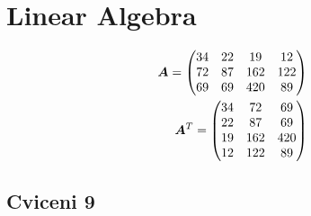\documentclass[12pt]{article}
\begin{document}
    \section{Linear Algebra}\label{sec:linalg}

    \begin{align}
        {\bm{A}} = \left(\begin{matrix}
                        34 & 22 & 19 & 12\\72 & 87 & 162 & 122\\69 & 69 & 420 & 89
        \end{matrix}\right) \\
        {\bm{A}}^{T} = \left(\begin{matrix}
                            34 & 72 & 69\\22 & 87 & 69\\19 & 162 & 420\\12 & 122 & 89
        \end{matrix}\right)
    \end{align}

    \subsection{Cviceni 9}\label{subsec:cv9}
\end{document}
